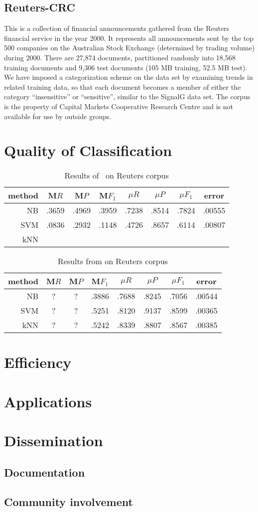 \subsection{Reuters-CRC}
This is a collection of financial announcements gathered from the
Reuters financial service in the year 2000.  It represents all
announcements sent by the top 500 companies on the Australian Stock
Exchange (determined by trading volume) during 2000.  There are 27,874
documents, partitioned randomly into 18,568 training documents and
9,306 test documents (105 MB training, 52.5 MB test).  We have imposed
a categorization scheme on the data set by examining trends in related
training data, so that each document becomes a member of either the
category ``insensitive'' or ``sensitive'', similar to the SignalG data
set.  The corpus is the property of Capital Markets Cooperative
Research Centre and is not available for use by outside groups.


\section{Quality of Classification}

\begin{table}
\begin{tabular}{|r c c c c c c c|}
\hline
method & M$R$ & M$P$ & M$F_1$ & $\mu R$ & $\mu P$ & $\mu F_1$ & error \\
\hline
NB  & .3659 & .4969 & .3959 & .7238 & .8514 & .7824 & .00555 \\
SVM & .0836 & .2932 & .1148 & .4726 & .8657 & .6114 & .00807 \\
kNN & \\
\hline
\end{tabular}
\caption{Results of \aicat\ on Reuters corpus}
\end{table}

\begin{table}
\begin{tabular}{|r c c c c c c c|}
\hline
method & M$R$ & M$P$ & M$F_1$ & $\mu R$ & $\mu P$ & $\mu F_1$ & error \\
\hline
NB  & ? & ? & .3886 & .7688 & .8245 & .7056 & .00544 \\
SVM & ? & ? & .5251 & .8120 & .9137 & .8599 & .00365 \\
kNN & ? & ? & .5242 & .8339 & .8807 & .8567 & .00385 \\
\hline
\end{tabular}
\caption{Results from \cite{yang:99} on Reuters corpus}
\end{table}


\section{Efficiency}

\section{Applications}


\section{Dissemination}
\subsection{Documentation}
\subsection{Community involvement}
